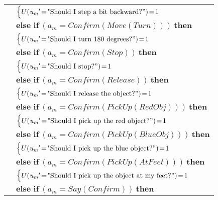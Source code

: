 \begin{footnotesize}
\begin{longtable}{p{2cm}l}
& \;\;\;\;\; $ \begin{cases}U(\mathit{u_m}'\!=\!\text{"Should I step a bit backward?}")\!=\!1 \end{cases}$ \vspace{1mm} \\ & $ \textbf{else if} \ (\mathit{a_m}\!=\!\mathit{Confirm(Move(Turn))}) \ \textbf{then}$ \\
& \;\;\;\;\; $ \begin{cases}U(\mathit{u_m}'\!=\!\text{"Should I turn 180 degrees?}")\!=\!1 \end{cases}$ \vspace{1mm} \\ & $ \textbf{else if} \ (\mathit{a_m}\!=\!\mathit{Confirm(Stop)}) \ \textbf{then}$ \\
& \;\;\;\;\; $ \begin{cases}U(\mathit{u_m}'\!=\!\text{"Should I stop?}")\!=\!1 \end{cases}$ \vspace{1mm} \\ & $ \textbf{else if} \ (\mathit{a_m}\!=\!\mathit{Confirm(Release)}) \ \textbf{then}$ \\
& \;\;\;\;\; $ \begin{cases}U(\mathit{u_m}'\!=\!\text{"Should I release the object?}")\!=\!1 \end{cases}$ \vspace{1mm} \\ & $ \textbf{else if} \ (\mathit{a_m}\!=\!\mathit{Confirm(PickUp(RedObj))}) \ \textbf{then}$ \\
& \;\;\;\;\; $ \begin{cases}U(\mathit{u_m}'\!=\!\text{"Should I pick up the red object?}")\!=\!1 \end{cases}$ \vspace{1mm} \\ & $ \textbf{else if} \ (\mathit{a_m}\!=\!\mathit{Confirm(PickUp(BlueObj))}) \ \textbf{then}$ \\
& \;\;\;\;\; $ \begin{cases}U(\mathit{u_m}'\!=\!\text{"Should I pick up the blue object?}")\!=\!1 \end{cases}$ \vspace{1mm} \\ & $ \textbf{else if} \ (\mathit{a_m}\!=\!\mathit{Confirm(PickUp(AtFeet))}) \ \textbf{then}$ \\
& \;\;\;\;\; $ \begin{cases}U(\mathit{u_m}'\!=\!\text{"Should I pick up the object at my feet?}")\!=\!1 \end{cases}$ \vspace{1mm} \\ & $ \textbf{else if} \ (\mathit{a_m}\!=\!\mathit{Say(Confirm)}) \ \textbf{then}$ \\

\end{longtable}
\end{footnotesize}
